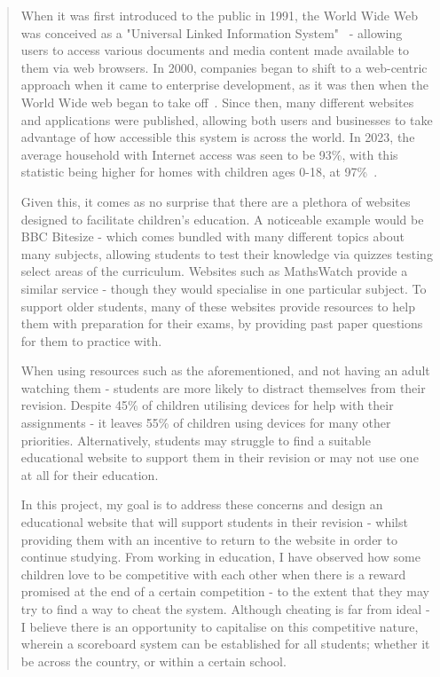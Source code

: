 \documentclass[]{final_report}
\begin{document}
\begin{abstract}

When it was first introduced to the public in 1991, the World Wide Web was conceived as a "Universal Linked Information System"~\cite{TBL_WWW} - allowing users to access various documents and media content made available to them via web browsers. In 2000, companies began to shift to a web-centric approach when it came to enterprise development, as it was then when the World Wide web began to take off~\cite{MODERN_WEB}. Since then, many different websites and applications were published, allowing both users and businesses to take advantage of how accessible this system is across the world. In 2023, the average household with Internet access was seen to be 93\%, with this statistic being higher for homes with children ages 0-18, at 97\%~\cite{INTERNET_USERS}.

Given this, it comes as no surprise that there are a plethora of websites designed to facilitate children's education. A noticeable example would be BBC Bitesize - which comes bundled with many different topics about many subjects, allowing students to test their knowledge via quizzes testing select areas of the curriculum. Websites such as MathsWatch provide a similar service - though they would specialise in one particular subject. To support older students, many of these websites provide resources to help them with preparation for their exams, by providing past paper questions for them to practice with.

When using resources such as the aforementioned, and not having an adult watching them - students are more likely to distract themselves from their revision. Despite 45\% of children utilising devices for help with their assignments\cite{DEVICE_REPORT} - it leaves 55\% of children using devices for many other priorities. Alternatively, students may struggle to find a suitable educational website to support them in their revision or may not use one at all for their education. 

In this project, my goal is to address these concerns and design an educational website that will support students in their revision - whilst providing them with an incentive to return to the website in order to continue studying. From working in education, I have observed how some children love to be competitive with each other when there is a reward promised at the end of a certain competition - to the extent that they may try to find a way to cheat the system. Although cheating is far from ideal - I believe there is an opportunity to capitalise on this competitive nature, wherein a scoreboard system can be established for all students; whether it be across the country, or within a certain school. 


\end{abstract}
\end{document}
